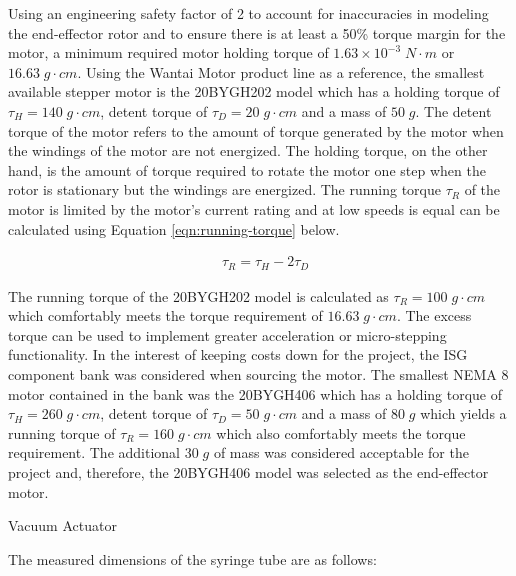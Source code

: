 Using an engineering safety factor of 2 to account for inaccuracies in modeling the end-effector rotor and to ensure there is at least a 50\% torque margin for the motor, a minimum required motor holding torque of $1.63 \times 10^{-3} \; N \cdot m$ or $16.63 \; g \cdot cm$. Using the Wantai Motor product line as a reference, the smallest available stepper motor is the 20BYGH202 model which has a holding torque of $\tau_H=140 \; g \cdot cm$, detent torque of $\tau_D=20 \; g \cdot cm$ and a mass of $50 \; g$. The detent torque of the motor refers to the amount of torque generated by the motor when the windings of the motor are not energized. The holding torque, on the other hand, is the amount of torque required to rotate the motor one step when the rotor is stationary but the windings are energized. The running torque $\tau_R$ of the motor is limited by the motor's current rating and at low speeds is equal can be calculated using Equation \ref{eqn:running-torque} below.

\begin{align}
	& \tau_R = \tau_H - 2\tau_D
	\label{eqn:running-torque}
\end{align}

The running torque of the 20BYGH202 model is calculated as $\tau_R=100 \; g \cdot cm$ which comfortably meets the torque requirement of $16.63 \; g \cdot cm$. The excess torque can be used to implement greater acceleration or micro-stepping functionality. In the interest of keeping costs down for the project, the ISG component bank was considered when sourcing the motor. The smallest NEMA 8 motor contained in the bank was the 20BYGH406 which has a holding torque of $\tau_H=260 \; g \cdot cm$, detent torque of $\tau_D=50 \; g \cdot cm$ and a mass of $80 \; g$ which yields a running torque of $\tau_R=160 \; g \cdot cm$ which also comfortably meets the torque requirement. The additional $30\;g$ of mass was considered acceptable for the project and, therefore, the 20BYGH406 model was selected as the end-effector motor.

Vacuum Actuator

The measured dimensions of the syringe tube are as follows:

